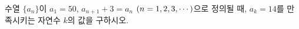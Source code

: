 수열 $\{a_n\}$이 $a_1=50$, $a_{n+1}+3=a_n$ $(n=1{,}\mkern3mu\mathopen{}2{,}\mkern3mu\mathopen{}3{,}\mkern3mu\mathopen{}\cdots)$으로 정의될 때, $a_k=14$를 만족시키는 자연수 $k$의 값을 구하시오.
